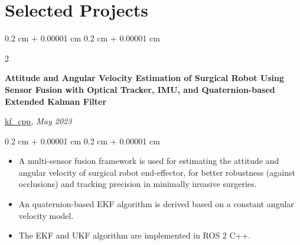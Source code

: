 \documentclass[10pt, letterpaper]{article}
\newenvironment{highlights}{
    \begin{itemize}[
        topsep=0.10 cm,
        parsep=0.10 cm,
        partopsep=0pt,
        itemsep=0pt,
        leftmargin=0.4 cm + 10pt
    ]
}{
    \end{itemize}
} %
\newenvironment{onecolentry}{
    \begin{adjustwidth}{
        0.2 cm + 0.00001 cm
    }{
        0.2 cm + 0.00001 cm
    }
}{
    \end{adjustwidth}
} %
\newenvironment{twocolentry}[2][]{
    \onecolentry
    \def\secondColumn{#2}
    \setcolumnwidth{\fill, 4.5 cm}
    \begin{paracol}{2}
}{
    \switchcolumn \raggedleft \secondColumn
    \end{paracol}
    \endonecolentry
} %
\let\hrefWithoutArrow\href
\renewcommand{\href}[2]{\hrefWithoutArrow{#1}{\ifthenelse{\equal{#2}{}}{ }{#2 }\raisebox{.15ex}{\footnotesize \faExternalLink*}}}
\begin{document}
    \section{Selected Projects}

        \begin{twocolentry}{
            \hrefWithoutArrow{https://github.com/wei-hsuan-cheng/kf_cpp}{{\footnotesize\faGithub}\hspace*{0.13cm}kf\_cpp}\textit{, May 2023}
            }

            \textbf{Attitude and Angular Velocity Estimation of Surgical Robot Using Sensor Fusion with Optical Tracker, IMU, and Quaternion-based Extended Kalman Filter}
        \end{twocolentry}
        \vspace{0.10 cm}
        \begin{onecolentry}
            \begin{highlights}
                \item A multi-sensor fusion framework is used for estimating the attitude and angular velocity of surgical robot end-effector, for better robustness (against occlusions) and tracking precision in minimally invasive surgeries.
                \item An quaternion-based EKF algorithm is derived based on a constant angular velocity model.
                \item The EKF and UKF algorithm are implemented in ROS 2 C++.
            \end{highlights}
        \end{onecolentry}

        \vspace{0.2 cm}
\end{document}
